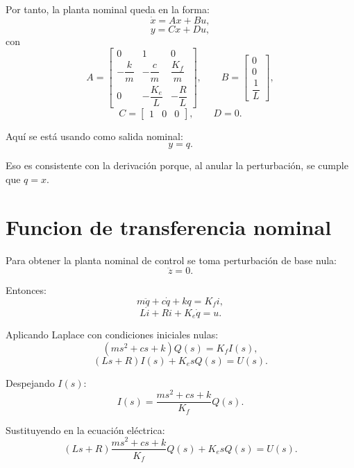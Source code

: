 \documentclass[11pt]{article}
\begin{document}
Por tanto, la planta nominal queda en la forma:
\begin{equation}
\dot x = Ax + Bu,
\label{eq:ss_nom_1}
\end{equation}
\begin{equation}
y = Cx + Du,
\label{eq:ss_nom_2}
\end{equation}
con
\begin{equation}
A=
\begin{bmatrix}
0 & 1 & 0\\
-\dfrac{k}{m} & -\dfrac{c}{m} & \dfrac{K_f}{m}\\
0 & -\dfrac{K_e}{L} & -\dfrac{R}{L}
\end{bmatrix},
\qquad
B=
\begin{bmatrix}
0\\
0\\
\dfrac{1}{L}
\end{bmatrix},
\label{eq:AB_nom}
\end{equation}
\begin{equation}
C=
\begin{bmatrix}
1 & 0 & 0
\end{bmatrix},
\qquad
D=0.
\label{eq:CD_nom}
\end{equation}

Aqu\'i se est\'a usando como salida nominal:
\[
y=q.
\]

Eso es consistente con la derivaci\'on porque, al anular la perturbaci\'on, se cumple que $q=x$.

\section{Funcion de transferencia nominal}

Para obtener la planta nominal de control se toma perturbaci\'on de base nula:
\[
\ddot z = 0.
\]

Entonces:
\begin{equation}
m\ddot q + c\dot q + kq = K_f i,
\label{eq:tf_mech}
\end{equation}
\begin{equation}
L\dot i + Ri + K_e\dot q = u.
\label{eq:tf_elec}
\end{equation}

Aplicando Laplace con condiciones iniciales nulas:
\[
(ms^2+cs+k)Q(s)=K_f I(s),
\]
\[
(Ls+R)I(s)+K_e sQ(s)=U(s).
\]

Despejando $I(s)$:
\[
I(s)=\frac{ms^2+cs+k}{K_f}Q(s).
\]

Sustituyendo en la ecuaci\'on el\'ectrica:
\[
(Ls+R)\frac{ms^2+cs+k}{K_f}Q(s)+K_e sQ(s)=U(s).
\]
\end{document}
